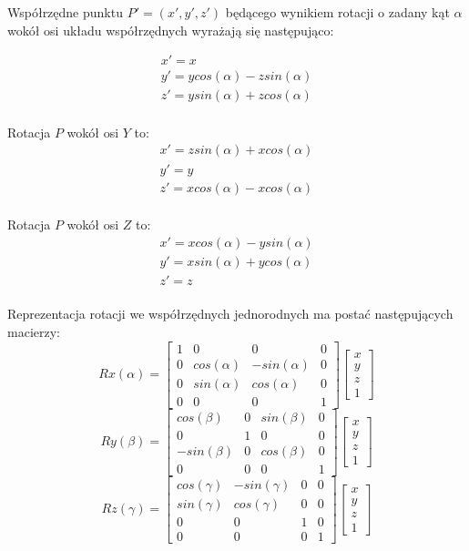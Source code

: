 \documentclass[licencjacka]{pracamgr}
\begin{document}
Współrzędne punktu $P'=(x',y',z')$ będącego wynikiem rotacji o zadany kąt $\alpha$ wokół osi układu współrzędnych wyrażają się następująco:

$$
\begin{array}{lr}
x'=x \\
y'=ycos(\alpha)-zsin(\alpha) \\
z'=ysin(\alpha)+zcos(\alpha)
\end{array}
$$
\\
Rotacja $P$ wokół osi $Y$ to:
$$
\begin{array}{lr}
x'=zsin(\alpha)+xcos(\alpha) \\
y'=y \\
z'=xcos(\alpha)-xcos(\alpha)
\end{array}
$$
\\
Rotacja $P$ wokół osi $Z$ to:
$$
\begin{array}{lr}
x'=xcos(\alpha)-ysin(\alpha) \\
y'=xsin(\alpha)+ycos(\alpha) \\
z'=z
\end{array}
$$
\\
Reprezentacja rotacji we współrzędnych jednorodnych ma postać następujących macierzy:
$$
Rx(\alpha) = 
\begin{bmatrix}
1 & 0 & 0 & 0 \\
0 & cos(\alpha) & -sin(\alpha) & 0 \\
0 & sin(\alpha) & cos(\alpha) & 0 \\
0 & 0 & 0 & 1
\end{bmatrix}
\begin{bmatrix}
x \\
y \\
z \\
1
\end{bmatrix}
$$
$$
Ry(\beta) = 
\begin{bmatrix}
cos(\beta) & 0 & sin(\beta) & 0 \\
0 & 1 & 0 & 0 \\
-sin(\beta) & 0 & cos(\beta) & 0 \\
0 & 0 & 0 & 1
\end{bmatrix}
\begin{bmatrix}
x \\
y \\
z \\
1
\end{bmatrix}
$$
$$
Rz(\gamma) = 
\begin{bmatrix}
cos(\gamma) & -sin(\gamma) & 0 & 0 \\
sin(\gamma) & cos(\gamma) & 0 & 0 \\
0 & 0 & 1 & 0 \\
0 & 0 & 0 & 1
\end{bmatrix}
\begin{bmatrix}
x \\
y \\
z \\
1
\end{bmatrix}
$$
\end{document}
